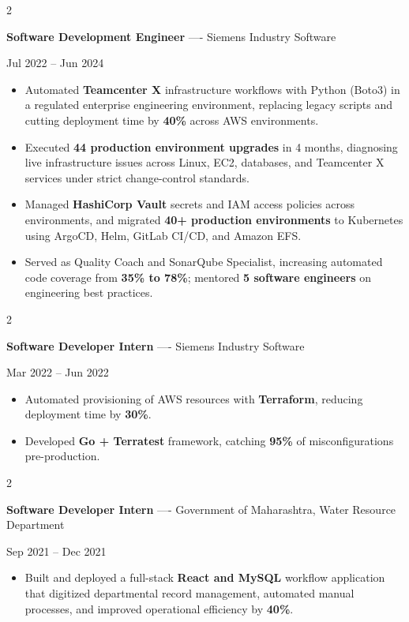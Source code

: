 \documentclass[10pt, letterpaper]{article}
\newenvironment{highlights}{
    \begin{itemize}[
        topsep=0.10 cm,
        parsep=0.06 cm,
        partopsep=0pt,
        itemsep=0.06 cm,
        leftmargin=12pt
    ]
}{
    \end{itemize}
}
\newenvironment{twocolentry}[2][]{
    \onecolentry
    \def\secondColumn{#2}
    \setcolumnwidth{\fill, 4.5 cm}
    \begin{paracol}{2}
}{
    \switchcolumn \raggedleft \secondColumn
    \end{paracol}
    \endonecolentry
}
\begin{document}
\vspace{0.15 cm}

\begin{twocolentry}{Jul 2022 -- Jun 2024}
\textbf{Software Development Engineer} ---- Siemens Industry Software
\end{twocolentry}
\begin{highlights}
  \item Automated \textbf{Teamcenter X} infrastructure workflows with Python (Boto3) in a regulated enterprise engineering environment, replacing legacy scripts and cutting deployment time by \textbf{40\%} across AWS environments.
  \item Executed \textbf{44 production environment upgrades} in 4 months, diagnosing live infrastructure issues across Linux, EC2, databases, and Teamcenter X services under strict change-control standards.
  \item Managed \textbf{HashiCorp Vault} secrets and IAM access policies across environments, and migrated \textbf{40+ production environments} to Kubernetes using ArgoCD, Helm, GitLab CI/CD, and Amazon EFS.
  \item Served as Quality Coach and SonarQube Specialist, increasing automated code coverage from \textbf{35\% to 78\%}; mentored \textbf{5 software engineers} on engineering best practices.
\end{highlights}

\vspace{0.15 cm}

\begin{twocolentry}{Mar 2022 -- Jun 2022}
\textbf{Software Developer Intern} ---- Siemens Industry Software
\end{twocolentry}
\begin{highlights}
  \item Automated provisioning of AWS resources with \textbf{Terraform}, reducing deployment time by \textbf{30\%}.
  \item Developed \textbf{Go + Terratest} framework, catching \textbf{95\%} of misconfigurations pre-production.
\end{highlights}

\vspace{0.15 cm}

\begin{twocolentry}{Sep 2021 -- Dec 2021}
\textbf{Software Developer Intern} ---- Government of Maharashtra, Water Resource Department
\end{twocolentry}
\begin{highlights}
  \item Built and deployed a full-stack \textbf{React and MySQL} workflow application that digitized departmental record management, automated manual processes, and improved operational efficiency by \textbf{40\%}.
\end{highlights}
\end{document}
